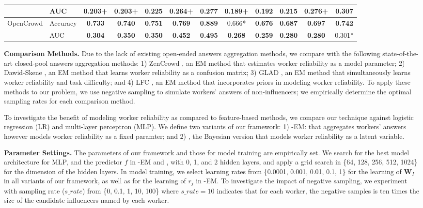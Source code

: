 \begin{table}[t]
\begin{tabular}{ll|ccccc|ccccc}
                             & AUC   & 0.203+         & 0.203+         & 0.225          & 0.264+         & 0.277          & 0.189+         & 0.192          & 0.215          & 0.276+         & \textbf{0.307}         \\ \hline
\multirow{2}{*}{OpenCrowd}   & Accuracy     & \textbf{0.733} & \textbf{0.740} & \textbf{0.751}         & \textbf{0.769} & \textbf{0.889}  & 0.666* & \textbf{0.676} &\textbf{0.687}         & \textbf{0.697}         & \textbf{0.742} \\ %
                             & AUC   & \textbf{0.304} & \textbf{0.350} & \textbf{0.350} & \textbf{0.452} & \textbf{0.495} & \textbf{0.268} & \textbf{0.259} & \textbf{0.280} & \textbf{0.280}  &  0.301*\\ \bottomrule
\end{tabular}
 \label{sec:compres}  
\end{table}

\smallskip
\noindent\textbf{Comparison Methods.} Due to the lack of existing open-ended answers aggregation methods, we compare with the following state-of-the-art closed-pool answers aggregation methods: 1) ZenCrowd \cite{demartini2012zencrowd}, an EM method that estimates worker reliability as a model parameter; 2) Dawid-Skene \cite{dawid1979maximum}, an EM method that learns worker reliability as a confusion matrix; 3) GLAD \cite{whitehill2009whose}, an EM method that simultaneously learns worker reliability and task difficulty; and 4) LFC \cite{raykar2010learning}, an EM method 
that incorporates priors in modeling worker reliability. To apply these methods to our problem, we use negative sampling to simulate workers' answers of non-influencers; we empirically determine the optimal sampling rates for each comparison method. 

To investigate the benefit of modeling worker reliability as compared to feature-based methods, we compare our technique against logistic regression (LR) and multi-layer perceptron (MLP). We define two variants of our framework: 1) \sys-EM: \sys that aggregates workers' answers however models worker reliability as a fixed paramter; and 2) \sys, the Bayesian version that models worker reliability as a latent variable.




\smallskip
\noindent\textbf{Parameter Settings.} The parameters of our framework and those for model training are empirically set. We search for the best model architecture for MLP, and the predictor $f$ in \sys-EM and \sys, with 0, 1, and 2 hidden layers, and apply a grid search in \{64, 128, 256, 512, 1024\} for the dimension of the hidden layers. In model training, we select learning rates from \{0.0001, 0.001, 0.01, 0.1, 1\} for the learning of $\mathbf{W}_I$ in all variants of our framework, as well as for the learning of $r_j$ in \sys-EM. To investigate the impact of negative sampling, we experiment with sampling rate ($s\_rate$) from \{0, 0.1, 1, 10, 100\} where $s\_rate=10$ indicates that for each worker, the negative samples is ten times the size of the candidate influencers named by each worker. 

